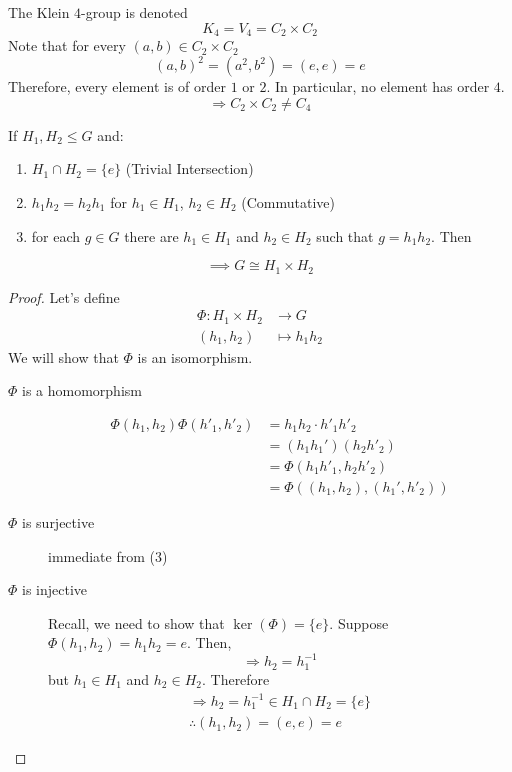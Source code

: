 \documentclass{article}
\begin{document}
\begin{eg}
    The Klein $4$-group is denoted
    \[
        K_4 = V_4 = C_2 \times C_2
    \]
    Note that for every $(a, b) \in C_2 \times C_2$
    \[
        (a, b)^2 = (a^2, b^2) = (e, e) = e  
    \]
    Therefore, every element is of order $1$ or $2$. In particular, no element has order $4$. 
    \[
        \Longrightarrow C_2 \times C_2 \neq C_4  
    \]
\end{eg}
\begin{thm}
    If $H_1, H_2 \leq G$ and:
    \begin{enumerate}[label=(\arabic*)]
        \item $H_1 \cap H_2 = \{ e \}$ \hspace*{\fill}(Trivial Intersection)
        \item $h_1 h_2 = h_2 h_1$ for $h_1 \in H_1$, $h_2 \in H_2$ \hspace*{\fill}(Commutative)
        \item for each $g \in G$ there are $h_1 \in H_1$ and $h_2 \in H_2$ such that $g = h_1h_2$. Then
    \end{enumerate}
    \[
        \implies G \cong H_1 \times H_2  
    \]
\end{thm}
\begin{proof}
    Let's define
    \begin{align*}
        \Phi: H_1 \times H_2 & \rightarrow G \\
        (h_1, h_2) &\mapsto h_1h_2
    \end{align*}
    We will show that $\Phi$ is an isomorphism.
    \begin{description}
        \item[$\Phi$ is a homomorphism]
        \begin{align*}
            \Phi(h_1, h_2) \Phi(h'_1, h'_2) &= h_1h_2 \cdot h'_1h'_2 \\
            &= (h_1h_1')(h_2h'_2) \\
            &= \Phi(h_1h'_1, h_2h'_2) \\
            &= \Phi((h_1, h_2), (h_1', h'_2))
        \end{align*}
        \item[$\Phi$ is surjective] immediate from (3)
        \item[$\Phi$ is injective] Recall, we need to show that $\ker(\Phi) = \{ e \}$.
        Suppose $\Phi(h_1, h_2) = h_1h_2 = e$. Then,
        \[
            \Rightarrow h_2 = h_1^{-1}
        \]
        but $h_1 \in H_1$ and $h_2 \in H_2$. Therefore
        \begin{align*}
            \Rightarrow h_2 = h_1^{-1} \in H_1 \cap H_2 = \{ e \} \\
            \therefore (h_1, h_2) = (e, e) = e
        \end{align*}
    \end{description}
\end{proof}
\end{document}
